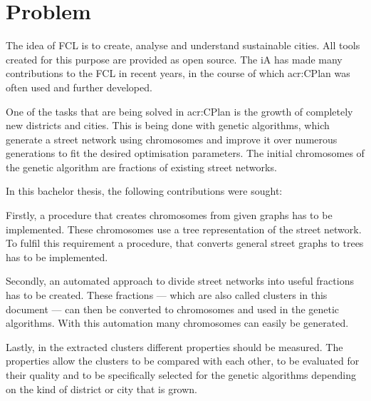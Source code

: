 \chapter{Problem}
The idea of \gls{FCL} is to create, analyse and understand sustainable cities. All tools created for this purpose are provided as open source. The \gls{iA} has made many contributions to the \gls{FCL} in recent years, in the course of which \acrshort{acr:CPlan} was often used and further developed.

One of the tasks that are being solved in \acrshort{acr:CPlan} is the growth of completely new districts and cities. This is being done with genetic algorithms, which generate a street network using chromosomes and improve it over numerous generations to fit the desired optimisation parameters. The initial chromosomes of the genetic algorithm are fractions of existing street networks.

In this bachelor thesis, the following contributions were sought:

Firstly, a procedure that creates chromosomes from given graphs has to be implemented. These chromosomes use a tree representation of the street network. To fulfil this requirement a procedure, that converts general street graphs to trees has to be implemented.

Secondly, an automated approach to divide street networks into useful fractions has to be created. These fractions --- which are also called clusters in this document --- can then be converted to chromosomes and used in the genetic algorithms. With this automation many chromosomes can easily be generated.

Lastly, in the extracted clusters different properties should be measured. The properties allow the clusters to be compared with each other, to be evaluated for their quality and to be specifically selected for the genetic algorithms depending on the kind of district or city that is grown.
